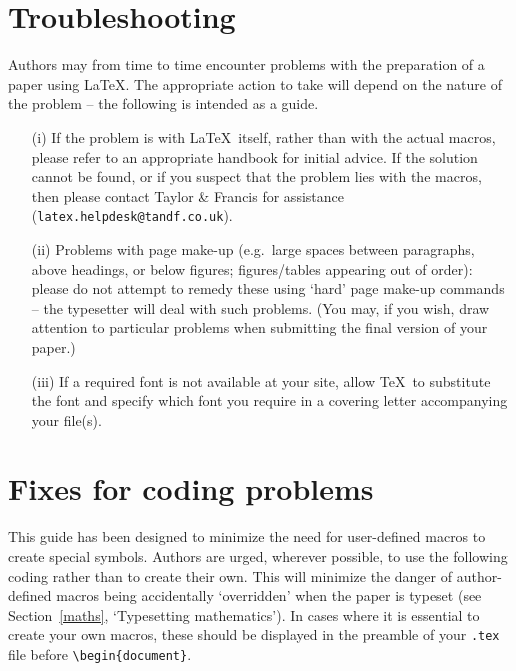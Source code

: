\documentclass{gCOV2e}
\theoremstyle{plain}%
\theoremstyle{definition}
\theoremstyle{remark}
\begin{document}
\section{Troubleshooting}

Authors may from time to time encounter problems with the preparation
of a paper using \LaTeX\/. The appropriate action to take will depend
on the nature of the problem -- the following is intended as a guide.

\begin{enumerate}
\item[(i)] If the problem is with \LaTeX\ itself, rather than with the
actual macros, please refer to an appropriate handbook for
initial advice. If the solution cannot be found, or if you
suspect that the problem lies with the macros, then please contact
Taylor \& Francis for assistance (\texttt{latex.helpdesk@tandf.co.uk}).

\item[(ii)] Problems with page make-up (e.g.\ large spaces between paragraphs,
above headings, or below figures; figures/tables appearing out of order):
please do not attempt to remedy these using `hard' page make-up
commands -- the typesetter will deal with such problems. (You may, if you
wish, draw attention to particular problems when submitting the final version
of your paper.)

\item[(iii)] If a required font is not available at your site, allow \TeX\
to substitute the font and specify which font you require in a covering letter
accompanying your file(s).
\end{enumerate}


\section{Fixes for coding problems}

This guide has been designed to minimize the need for user-defined macros to create special symbols. Authors
are urged, wherever possible, to use the following coding rather than to create their own. This will minimize
the danger of author-defined macros being accidentally `overridden' when the paper is typeset (see
Section~\ref{maths}, `Typesetting mathematics'). In cases where it is essential to create your own macros,
these should be displayed in the preamble of your \texttt{.tex} file before \verb"\begin{document}".
\end{document}
